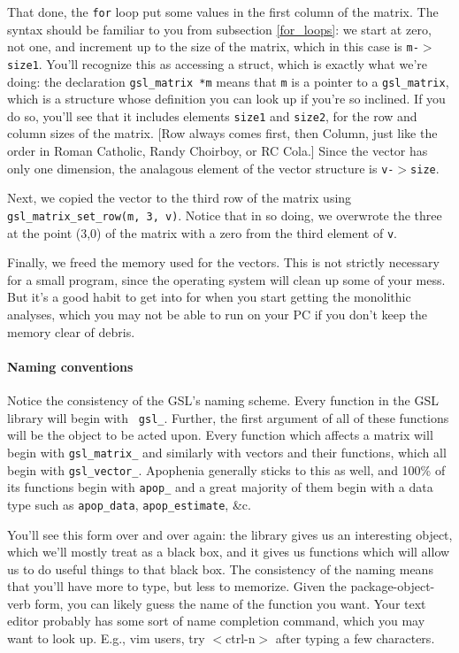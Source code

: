 That done, the {\tt for} loop put some values in the first column of the matrix. 
The syntax should be familiar to you from subsection \ref{for_loops}: we start at
zero, not one, and increment up to the size of the matrix, which in this case is
{\tt m-$>$size1}. You'll recognize this as accessing a struct, which is exactly
what we're doing: the declaration {\tt gsl\_matrix *m} means that {\tt m} is a
pointer to a {\tt gsl\_matrix}, which is a structure whose definition you can
look up if you're so inclined. If you do so, you'll see that it includes 
elements {\tt size1} and {\tt size2}, for the row and column sizes of the
matrix. [Row always comes first, then Column, just like the order in Roman Catholic, 
Randy Choirboy, or RC Cola.] Since the vector has only one dimension, the analagous element
of the vector structure is {\tt v-$>$size}.

Next, we copied the vector to the third row of the matrix using {\tt
gsl\-\_matrix\-\_set\-\_row(m, 3, v)}. Notice that in so doing, we
overwrote the three at the point (3,0) of the matrix with a zero from
the third element of {\tt v}.

Finally, we freed the memory used for the vectors. This is not strictly
necessary for a small program, since the operating system
will clean up some of your mess. But it's a good habit to get into for
when you start getting the monolithic analyses, which you may not be
able to run on your PC if you don't keep the memory clear of debris.

\paragraph{Naming conventions}  
Notice the consistency of
the GSL's naming scheme. Every function in the GSL library will begin with {\tt
gsl\_}. 
Further, the first argument of all of these functions will be the object to be acted upon.
Every function which affects a matrix will begin with {\tt gsl\_matrix\_}
and similarly with vectors and their functions, which all begin with {\tt gsl\_vector\_}. 
Apophenia generally sticks to this as well, and 100\% of its functions
begin with {\tt apop\_} and a great majority of them begin with a data
type such as {\tt apop\_data}, {\tt apop\_estimate}, \&c.

You'll see this form over and over again: the library gives us an interesting
object, which we'll mostly treat as a black box, and it gives us functions which
will allow us to do useful things to that black box. The consistency of the
naming means that you'll have more to type, but less to memorize. Given
the package-object-verb form, you can likely guess the name of the
function you want. Your text editor probably has some sort of name
completion command, which you may want to look up. E.g., vim users,
try $<$ctrl-n$>$ after typing a few characters.

